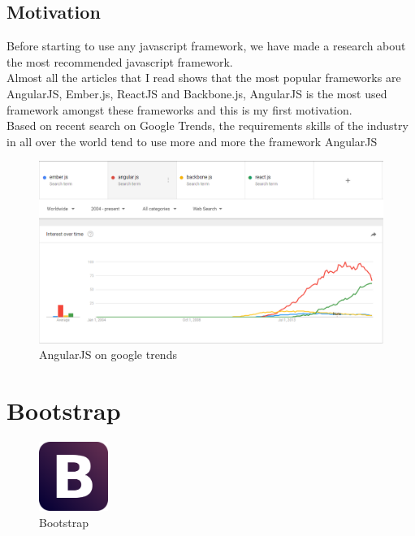 	\subsection{Motivation}
	Before starting to use any javascript framework, we have made a research about the most recommended javascript framework.
	\\
	Almost all the articles that I read shows that the most popular frameworks are \colorbox{mygray}{AngularJS}, \colorbox{mygray}{Ember.js}, \colorbox{mygray}{ReactJS} and \colorbox{mygray}{Backbone.js}, AngularJS is the most used framework amongst these frameworks and this is my first motivation.\\
    Based on recent search on Google Trends, the requirements skills  of the industry in all over the world tend  to use more and more the framework AngularJS
	 	\begin{figure}[h]
	 	\centering
	 	\includegraphics[width=1.0\textwidth]{AngularJS_statics_google_trends.png}
	 	\caption{AngularJS on google trends}
	 \end{figure}
	 

\clearpage
\newpage

	\section{Bootstrap}
	\begin{figure}[h]
		\centering
		\includegraphics[width=0.20\textwidth]{Boostrap_logo.png}
		\caption{Bootstrap}
	\end{figure}
